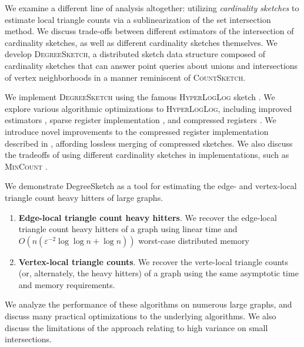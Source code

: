 \documentclass{report}
\newcommand{\algoname}[1]{\textnormal{\textsc{#1}}}
\begin{document}
We examine a different line of analysis altogether: utilizing \emph{cardinality sketches} to estimate local triangle counts via a sublinearization of the set intersection method.
We discuss trade-offs between different estimators of the intersection of cardinality sketches, as well as different cardinality sketches themselves.
We develop \algoname{DegreeSketch}, a distributed sketch data structure composed of cardinality sketches that can answer point queries about unions and intersections of vertex neighborhoods in a manner reminiscent of \algoname{CountSketch}.

We implement \algoname{DegreeSketch} using the famous \algoname{HyperLogLog} sketch \cite{flajolet2007hyperloglog}. 
We explore various algorithmic optimizations to \algoname{HyperLogLog}, including improved estimators \cite{heule2013hyperloglog, qin2016loglog, lang2017back, ertl2017new}, sparse register implementation \cite{heule2013hyperloglog}, and compressed registers \cite{xiao2017better}.
We introduce novel improvements to the compressed register implementation described in \cite{xiao2017better}, affording lossless merging of compressed sketches.
We also discuss the tradeoffs of using different cardinality sketches in implementations, such as \algoname{MinCount} \cite{giroire2009order}.

We demonstrate DegreeSketch as a tool for estimating the edge- and vertex-local triangle count heavy hitters of large graphs. 
%
\begin{enumerate}
	\item \textbf{Edge-local triangle count heavy hitters}. We recover the edge-local triangle count heavy hitters of a graph using linear time and $O(n (\varepsilon^{-2} \log\log n + \log n))$ worst-case distributed memory
	\item \textbf{Vertex-local triangle counts}. We recover the verte-local triangle counts (or, alternately, the heavy hitters) of a graph using the same asymptotic time and memory requirements.
\end{enumerate}
%
We analyze the performance of these algorithms on numerous large graphs, and discuss many practical optimizations to the underlying algorithms. 
We also discuss the limitations of the approach relating to high variance on small intersections.
\end{document}
